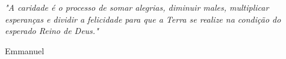 \documentclass[a4paper, 12pt]{article}
\begin{document}





\begin{titlepage}

   \epigraph{\textit{"A caridade é o processo de somar alegrias, diminuir males, multiplicar esperanças e dividir a felicidade para que a Terra se realize na condição do esperado Reino de Deus."}}{Emmanuel} \newpage

\end{titlepage}
\newpage







\pagestyle{fancy} 
\lfoot{}



\end{document}
